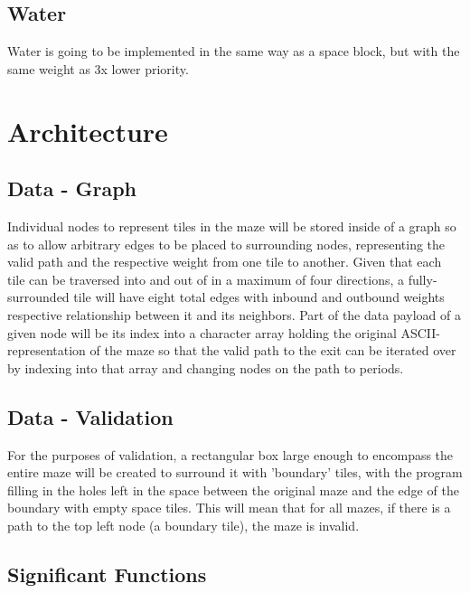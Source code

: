 \documentclass[11pt]{report}
\begin{document}
\subsection*{Water}
Water is going to be implemented in the same way as a space block, but with the same weight as 3x lower priority.
\pagebreak
\section*{Architecture}
\subsection*{Data - Graph}
Individual nodes to represent tiles in the maze will be stored inside of a graph so as to allow arbitrary edges to be placed to surrounding nodes, representing the valid path and the respective weight from one tile to another. Given that each tile can be traversed into and out of in a maximum of four directions, a fully-surrounded tile will have eight total edges with inbound and outbound weights respective relationship between it and its neighbors. Part of the data payload of a given node will be its index into a character array holding the original ASCII-representation of the maze so that the valid path to the exit can be iterated over by indexing into that array and changing nodes on the path to periods.
\subsection*{Data - Validation}
For the purposes of validation, a rectangular box large enough to encompass the entire maze will be created to surround it with 'boundary' tiles, with the program filling in the holes left in the space between the original maze and the edge of the boundary with empty space tiles. This will mean that for all mazes, if there is a path to the top left node (a boundary tile), the maze is invalid.
\pagebreak
\subsection*{Significant Functions}
\end{document}
